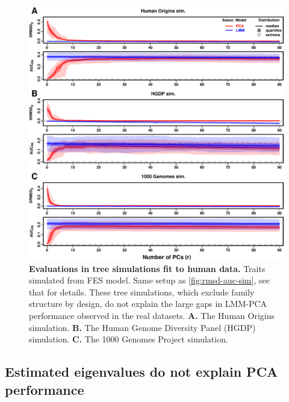 \documentclass[11pt]{article}
\begin{document}
\begin{figure}[bp!]
  \centering
  \includegraphics[width=\textwidth,height=\textheight,keepaspectratio]{fes/rmsd-auc-real-sim.pdf}
  \caption{
    {\small 
      {\bf Evaluations in tree simulations fit to human data.}
      Traits simulated from FES model.
      Same setup as \cref{fig:rmsd-auc-sim}, see that for details.
      These tree simulations, which exclude family structure by design, do not explain the large gaps in LMM-PCA performance observed in the real datasets.
      \textbf{A.}
      The Human Origins simulation.
      \textbf{B.}
      The Human Genome Diversity Panel (HGDP) simulation.
      \textbf{C.}
      The 1000 Genomes Project simulation.
    }
  }
  \label{fig:rmsd-auc-real-sim}
\end{figure}

\subsection{Estimated eigenvalues do not explain PCA performance}
\end{document}
